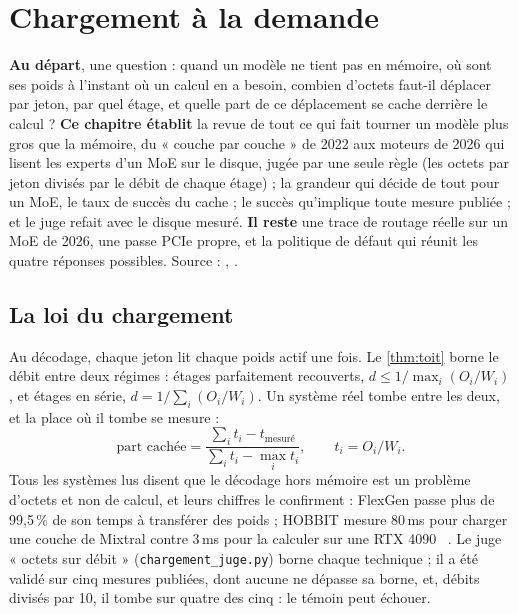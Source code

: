 \chapter{Chargement à la demande}\label{ch:chargement}

\begin{origine}
\textbf{Au départ}, une question : quand un modèle ne tient pas en mémoire, où sont ses poids à l'instant où un calcul en a besoin, combien d'octets faut-il déplacer par jeton, par quel étage, et quelle part de ce déplacement se cache derrière le calcul ?
\textbf{Ce chapitre établit} la revue de tout ce qui fait tourner un modèle plus gros que la mémoire, du « couche par couche » de 2022 aux moteurs de 2026 qui lisent les experts d'un MoE sur le disque, jugée par une seule règle (les octets par jeton divisés par le débit de chaque étage) ; la grandeur qui décide de tout pour un MoE, le taux de succès du cache ; le succès qu'implique toute mesure publiée ; et le juge refait avec le disque mesuré.
\textbf{Il reste} une trace de routage réelle sur un MoE de 2026, une passe PCIe propre, et la politique de défaut qui réunit les quatre réponses possibles.
Source : , .
\end{origine}

\section{La loi du chargement}\label{sec:loi-chargement}

Au décodage, chaque jeton lit chaque poids actif une fois. Le \cref{thm:toit} borne le débit entre deux régimes : étages parfaitement recouverts, $d \le 1/\max_i (O_i/W_i)$, et étages en série, $d = 1/\sum_i (O_i/W_i)$. Un système réel tombe entre les deux, et la place où il tombe se mesure :
\begin{equation}\label{eq:part-cachee}
\text{part cachée} = \frac{\sum_i t_i - t_{\text{mesuré}}}{\sum_i t_i - \max_i t_i}, \qquad t_i = O_i/W_i .
\end{equation}
Tous les systèmes lus disent que le décodage hors mémoire est un problème d'octets et non de calcul, et leurs chiffres le confirment : FlexGen passe plus de 99,5\,\% de son temps à transférer des poids ; HOBBIT mesure 80\,ms pour charger une couche de Mixtral contre 3\,ms pour la calculer sur une RTX 4090 \litt~\cite{flexgen2023,hobbit2024}. Le juge « octets sur débit » (\texttt{chargement\_juge.py}) borne chaque technique ; il a été validé sur cinq mesures publiées, dont aucune ne dépasse sa borne, et, débits divisés par 10, il tombe sur quatre des cinq : le témoin peut échouer.

